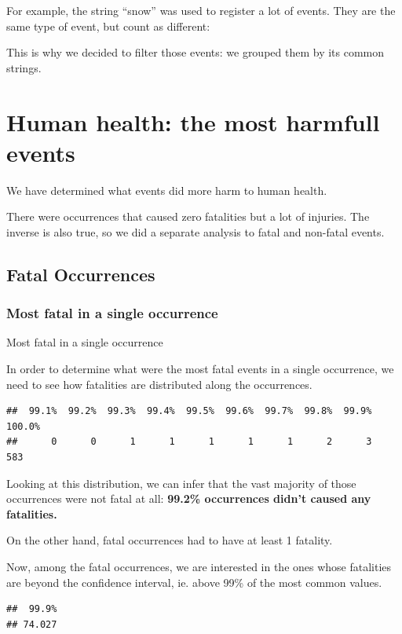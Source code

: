 \documentclass[]{article}
\begin{document}
For example, the string ``snow'' was used to register a lot of events.
They are the same type of event, but count as different:

This is why we decided to filter those events: we grouped them by its
common strings.

\section{Human health: the most harmfull
events}\label{human-health-the-most-harmfull-events}

We have determined what events did more harm to human health.

There were occurrences that caused zero fatalities but a lot of
injuries. The inverse is also true, so we did a separate analysis to
fatal and non-fatal events.

\subsection{Fatal Occurrences}\label{fatal-occurrences}

\subsubsection{Most fatal in a single
occurrence}\label{most-fatal-in-a-single-occurrence}

Most fatal in a single occurrence

In order to determine what were the most fatal events in a single
occurrence, we need to see how fatalities are distributed along the
occurrences.

\begin{verbatim}
##  99.1%  99.2%  99.3%  99.4%  99.5%  99.6%  99.7%  99.8%  99.9% 100.0% 
##      0      0      1      1      1      1      1      2      3    583
\end{verbatim}

Looking at this distribution, we can infer that the vast majority of
those occurrences were not fatal at all: \textbf{99.2\% occurrences
didn't caused any fatalities.}

On the other hand, fatal occurrences had to have at least 1 fatality.

Now, among the fatal occurrences, we are interested in the ones whose
fatalities are beyond the confidence interval, ie. above 99\% of the
most common values.

\begin{verbatim}
##  99.9% 
## 74.027
\end{verbatim}
\end{document}
